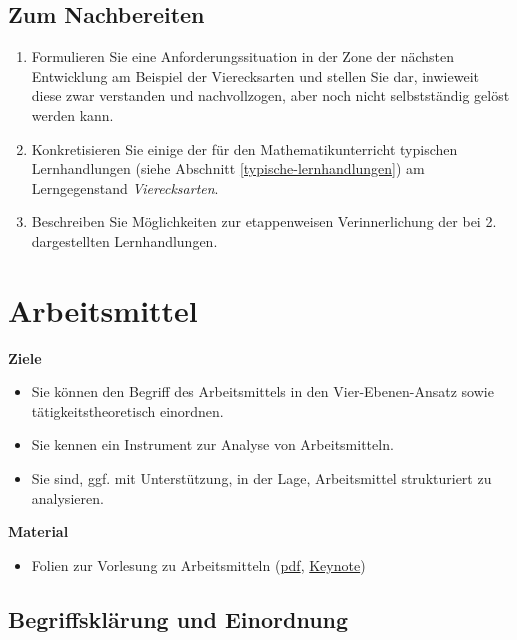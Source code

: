 \documentclass[
]{scrbook}
\providecommand{\tightlist}{%
  \setlength{\itemsep}{0pt}\setlength{\parskip}{0pt}}
\renewenvironment{quote}{
  \list{}{
	\leftmargin0.2cm   %
    \rightmargin\leftmargin
      	\def\FrameCommand
    {%
        {\color{quoteColor}\vrule width 2pt}%
        \hspace{0pt}%
    }%
    \MakeFramed{\advance \hsize -\width \FrameRestore}    \color{quoteColor}
    }
  \item\relax
}
{\endlist\color{black}\endMakeFramed}
\theoremstyle{definition}
\theoremstyle{definition}
\theoremstyle{definition}
\theoremstyle{definition}
\theoremstyle{remark}
\begin{document}
\hypertarget{lerntaetigkeit-nachbereitung}{%
\section{Zum Nachbereiten}\label{lerntaetigkeit-nachbereitung}}

\begin{enumerate}
\def\labelenumi{\arabic{enumi}.}
\item
  Formulieren Sie eine Anforderungssituation in der Zone der nächsten Entwicklung am Beispiel der Vierecksarten und stellen Sie dar, inwieweit diese zwar verstanden und nachvollzogen, aber noch nicht selbstständig gelöst werden kann.
\item
  Konkretisieren Sie einige der für den Mathematikunterricht typischen Lernhandlungen (siehe Abschnitt \ref{typische-lernhandlungen}) am Lerngegenstand \emph{Vierecksarten}.
\item
  Beschreiben Sie Möglichkeiten zur etappenweisen Verinnerlichung der bei 2. dargestellten Lernhandlungen.
\end{enumerate}

\hypertarget{arbeitsmittel}{%
\chapter{Arbeitsmittel}\label{arbeitsmittel}}

\begin{quote}
\textbf{Ziele}

\begin{itemize}
\tightlist
\item
  Sie können den Begriff des Arbeitsmittels in den Vier-Ebenen-Ansatz sowie tätigkeitstheoretisch einordnen.
\item
  Sie kennen ein Instrument zur Analyse von Arbeitsmitteln.
\item
  Sie sind, ggf. mit Unterstützung, in der Lage, Arbeitsmittel strukturiert zu analysieren.
\end{itemize}

\textbf{Material}

\begin{itemize}
\tightlist
\item
  Folien zur Vorlesung zu Arbeitsmitteln (\href{files/Stoffdidaktik-WiSe2223-Kap7.pdf}{pdf}, \href{files/Stoffdidaktik-WiSe2223-Kap7.key}{Keynote})
\end{itemize}
\end{quote}

\hypertarget{arbeitsmittel-begriffsklaerung}{%
\section{Begriffsklärung und Einordnung}\label{arbeitsmittel-begriffsklaerung}}
\end{document}
